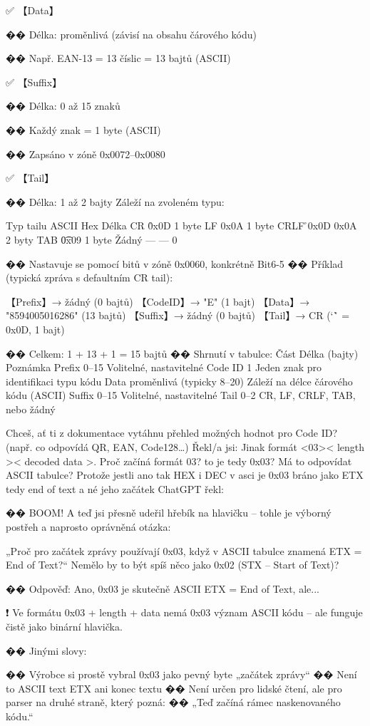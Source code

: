 ✅ 【Data】

    �� Délka: proměnlivá (závisí na obsahu čárového kódu)

    �� Např. EAN-13 = 13 číslic = 13 bajtů (ASCII)

✅ 【Suffix】

    �� Délka: 0 až 15 znaků

    �� Každý znak = 1 byte (ASCII)

    �� Zapsáno v zóně 0x0072–0x0080

✅ 【Tail】

    �� Délka: 1 až 2 bajty
    Záleží na zvoleném typu:

Typ tailu	ASCII	Hex	Délka
CR	\r	0x0D	1 byte
LF	\n	0x0A	1 byte
CRLF	\r\n	0x0D 0x0A	2 byty
TAB	\t	0x09	1 byte
Žádný	—	—	0

�� Nastavuje se pomocí bitů v zóně 0x0060, konkrétně Bit6-5​
�� Příklad (typická zpráva s defaultním CR tail):

【Prefix】→ žádný (0 bajtů)
【CodeID】→ "E" (1 bajt)
【Data】→ "8594005016286" (13 bajtů)
【Suffix】→ žádný (0 bajtů)
【Tail】→ CR (`\r` = 0x0D, 1 bajt)

�� Celkem: 1 + 13 + 1 = 15 bajtů
�� Shrnutí v tabulce:
Část	Délka (bajty)	Poznámka
Prefix	0–15	Volitelné, nastavitelné
Code ID	1	Jeden znak pro identifikaci typu kódu
Data	proměnlivá (typicky 8–20)	Záleží na délce čárového kódu (ASCII)
Suffix	0–15	Volitelné, nastavitelné
Tail	0–2	CR, LF, CRLF, TAB, nebo žádný

Chceš, ať ti z dokumentace vytáhnu přehled možných hodnot pro Code ID? (např. co odpovídá QR, EAN, Code128…)
Řekl/a jsi:
Jinak formát <03>< length >< decoded data >. Proč začíná formát 03? to je tedy 0x03? Má to odpovídat ASCII tabulce? Protože jestli ano tak HEX i DEC v asci je 0x03 bráno jako ETX tedy end of text a né jeho začátek
ChatGPT řekl:

�� BOOM! A teď jsi přesně udeřil hřebík na hlavičku – tohle je výborný postřeh a naprosto oprávněná otázka:

    „Proč pro začátek zprávy používají 0x03, když v ASCII tabulce znamená ETX = End of Text?“
    Nemělo by to být spíš něco jako 0x02 (STX – Start of Text)?

�� Odpověď: Ano, 0x03 je skutečně ASCII ETX = End of Text, ale...

    ❗ Ve formátu 0x03 + length + data nemá 0x03 význam ASCII kódu – ale funguje čistě jako binární hlavička.

�� Jinými slovy:

    �� Výrobce si prostě vybral 0x03 jako pevný byte „začátek zprávy“
    �� Není to ASCII text ETX ani konec textu
    �� Není určen pro lidské čtení, ale pro parser na druhé straně, který pozná:
    �� „Teď začíná rámec naskenovaného kódu.“

